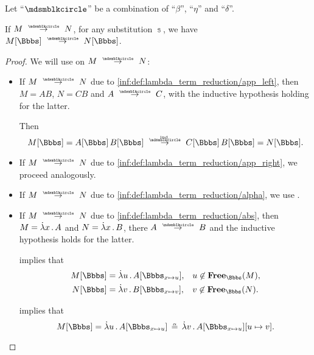 \begin{proposition}\label{thm:substitution_on_single_step_reduction}
  Let \enquote{\( {\Anon} \)} be a combination of \enquote{\( \beta \)}, \enquote{\( \eta \)} and \enquote{\( \delta \)}.

  If \( M \pred N \), for any substitution \( \Bbbs \), we have \( M[\Bbbs] \pred N[\Bbbs] \).
\end{proposition}
\begin{proof}
  We will use  on \( M \pred N \):
  \begin{itemize}
    \item If \( M \pred N \) due to \ref{inf:def:lambda_term_reduction/app_left}, then \( M = AB \), \( N = CB \) and \( A \pred C \), with the inductive hypothesis holding for the latter.

    Then
    \begin{equation*}
      M[\Bbbs]
      =
      A[\Bbbs] \thinspace B[\Bbbs]
      \reloset{\T{ind.}} \pred
      C[\Bbbs] \thinspace B[\Bbbs]
      =
      N[\Bbbs].
    \end{equation*}

    \item If \( M \pred N \) due to \ref{inf:def:lambda_term_reduction/app_right}, we proceed analogously.

    \item If \( M \pred N \) due to \ref{inf:def:lambda_term_reduction/alpha}, we use .

    \item If \( M \pred N \) due to \ref{inf:def:lambda_term_reduction/abs}, then \( M = \qabs x A \) and \( N = \qabs x B \), there \( A \pred B \) and the inductive hypothesis holds for the latter.

     implies that
    \begin{align*}
      M[\Bbbs] &= \qabs u A[\Bbbs_{x \mapsto u}], &&u \not\in \op*{Free}_\Bbbs(M), \\
      N[\Bbbs] &= \qabs v B[\Bbbs_{x \mapsto v}], &&v \not\in \op*{Free}_\Bbbs(N).
    \end{align*}

     implies that
    \begin{equation*}
      M[\Bbbs] = \qabs u A[\Bbbs_{x \mapsto u}] \aequiv \qabs v A[\Bbbs_{x \mapsto u}][u \mapsto v].
    \end{equation*}


\end{itemize}
\end{proof}
